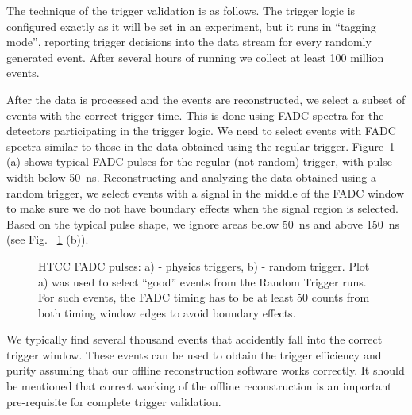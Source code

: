 The technique of the trigger validation is as follows. The trigger logic is configured exactly as it will be set in
an experiment, but it runs in ``tagging mode'', reporting trigger decisions into the data stream for every
randomly generated event. After several hours of running we collect at least 100 million events.

After the data is processed and the events are reconstructed, we select a subset of events with the correct
trigger time. This is done using FADC spectra for the detectors participating in the trigger logic. We need to
select events with FADC spectra similar to those in the data obtained using the regular trigger.
Figure~\ref{fig:htcc_fadc} (a) shows typical FADC pulses for the regular (not random) trigger, with pulse
width below 50~ns. Reconstructing and analyzing the data obtained using a random trigger, we select events
with a signal in the middle of the FADC window to make sure we do not have boundary effects when the signal
region is selected. Based on the typical pulse shape, we ignore areas below 50~ns and above 150~ns (see
Fig. ~\ref{fig:htcc_fadc} (b)).

\begin{figure}[!htb]
	\centering
	\caption{HTCC FADC pulses: a) - physics triggers, b) - random trigger. Plot a) was used to select ``good''
          events from the Random Trigger runs. For such events, the FADC timing has to be at least 50 counts
          from both timing window edges to avoid boundary effects.}
	\label{fig:htcc_fadc}
\end{figure}

We typically find several thousand events that accidently fall into the correct trigger window. These events
can be used to obtain the trigger efficiency and purity assuming that our offline reconstruction software
works correctly. It should be mentioned that correct working of the offline reconstruction is an important
pre-requisite for complete trigger validation.

